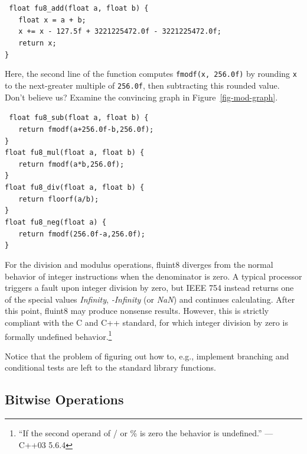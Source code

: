 \documentclass{acmsiggraph}
\theoremstyle{remark}
\theoremstyle{definition}
\begin{document}
{\tt
float fu8\_add(float a, float b) \{ \\
$\phantom{XX}$float x = a + b; \\
$\phantom{XX}$x += x - 127.5f + 3221225472.0f - 3221225472.0f; \\
$\phantom{XX}$return x; \\
\} \\
}

Here, the second line of the function computes {\tt fmodf(x, 256.0f)} by rounding {\tt x} to the next-greater multiple of {\tt 256.0f}, then subtracting this rounded value.
Don't believe us? Examine the convincing graph in Figure~\ref{fig-mod-graph}.

{\tt
float fu8\_sub(float a, float b) \{ \\
$\phantom{XX}$return fmodf(a+256.0f-b,256.0f); \\
\} \\
float fu8\_mul(float a, float b) \{ \\
$\phantom{XX}$return fmodf(a*b,256.0f); \\
\} \\
float fu8\_div(float a, float b) \{ \\
$\phantom{XX}$return floorf(a/b); \\
\} \\
float fu8\_neg(float a) \{ \\
$\phantom{XX}$return fmodf(256.0f-a,256.0f); \\
\} \\
}

For the division and modulus operations, fluint8 diverges from the
normal behavior of integer instructions when the denominator is zero.
A typical processor triggers a fault upon integer division by zero,
but IEEE 754 instead returns one of the special values {\it Infinity},
{\it -Infinity} (or {\it NaN}) and continues calculating. After this
point, fluint8 may produce nonsense results. However, this is strictly
compliant with the C and C++ standard, for which integer division by
zero is formally undefined behavior.\footnote{``If the second operand of / or \% is zero the behavior is undefined.'' --- C++03 5.6.4}

\medskip

Notice that the problem of figuring out how to, e.g., implement branching and conditional tests are left to the standard library functions.

\subsection{Bitwise Operations}
\end{document}
